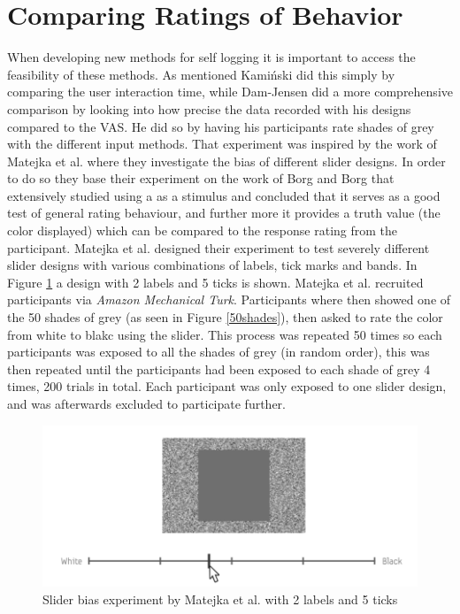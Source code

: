 \section{Comparing Ratings of Behavior}
When developing new methods for self logging it is important to access the feasibility of these methods. As mentioned Kami\'nski did this simply by comparing the user interaction time, while Dam-Jensen did a more comprehensive comparison by looking into how precise the data recorded with his designs compared to the VAS. He did so by having his participants rate shades of grey with the different input methods. That experiment was inspired by the work of Matejka et al.\cite{grey} where they investigate the bias of different slider designs. In order to do so they base their experiment on the work of Borg and Borg\cite{borg} that extensively studied using a  as a stimulus and concluded that it serves as a good test of general rating behaviour, and further more it provides a truth value (the color displayed) which can be compared to the response rating from the participant. Matejka et al. designed their experiment to test severely different slider designs with various combinations of labels, tick marks and bands. In Figure \ref{mate_ex} a design with 2 labels and 5 ticks is shown. Matejka et al. recruited participants via \emph{Amazon Mechanical Turk}\cite{turk}. Participants where then showed one of the 50 shades of grey (as seen in Figure \ref{50shades}), then asked to rate the color from white to blakc using the slider. This process was repeated 50 times so each participants was exposed to all the shades of grey (in random order), this was then repeated until the participants had been exposed to each shade of grey 4 times, 200 trials in total. Each participant was only exposed to one slider design, and was afterwards excluded to participate further. 

\begin{figure}[h!]
    \centering
    \includegraphics[width=1\textwidth]{figures/mate_ex.png}
    \caption{Slider bias experiment by Matejka et al.\cite{grey} with 2 labels and 5 ticks}
    \label{mate_ex}
\end{figure}

